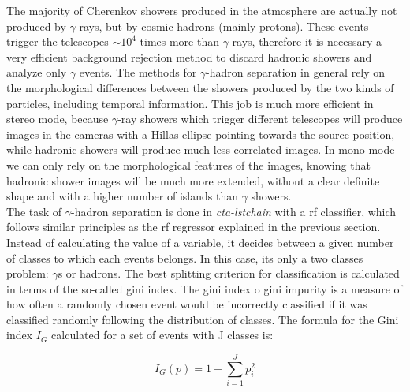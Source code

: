 \documentclass[main.tex]{subfiles}
\begin{document}
The majority of Cherenkov showers produced in the atmosphere are actually not produced by $\gamma$-rays, but by cosmic hadrons (mainly protons). These events trigger the telescopes $\sim 10^4$ times more than $\gamma$-rays, therefore it is necessary a very efficient background rejection method to discard hadronic showers and analyze only $\gamma$ events. The methods for $\gamma$-hadron separation in general rely on the morphological differences between the showers produced by the two kinds of particles, including temporal information. This job is much more efficient in stereo mode, because $\gamma$-ray showers which trigger different telescopes will produce images in the cameras with a Hillas ellipse pointing towards the source position, while hadronic showers will produce much less correlated images. In mono mode we can only rely on the morphological features of the images, knowing that hadronic shower images will be much more extended, without a clear definite shape and with a higher number of islands than $\gamma$ showers.\\
The task of $\gamma$-hadron separation is done in \textit{cta-lstchain} with a \gls{rf} classifier, which follows similar principles as the \gls{rf} regressor explained in the previous section. Instead of calculating the value of a variable, it decides between a given number of classes to which each events belongs. In this case, its only a two classes problem: $\gamma$s or hadrons.
The best splitting criterion for classification is calculated in terms of the so-called gini index. The gini index o gini impurity is a measure of how often a randomly chosen event would be incorrectly classified if it was classified randomly following the distribution of classes. The formula for the Gini index $I_G$ calculated for a set of events with J classes is:

\begin{equation}
  I_G(p) = 1 - \sum_{i=1}^J p_i^2
\end{equation}
\end{document}
